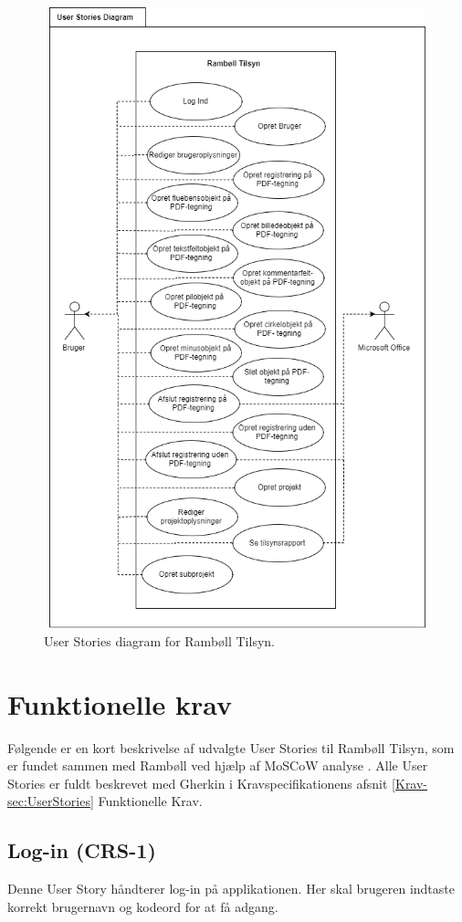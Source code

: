 	\begin{figure}[H]
		\centering
		\includegraphics[height=18cm, width=12cm]{Kravspecifikation/UserStorieDiagram}
		\caption{User Stories diagram for Rambøll Tilsyn.}
		\label{fig:Userstoriediagram}
	\end{figure}
	
	\clearpage
	
\section{Funktionelle krav} \label{sec:UserS}
	Følgende er en kort beskrivelse af udvalgte User Stories til Rambøll Tilsyn, som er fundet sammen med Rambøll ved hjælp af MoSCoW analyse \cite{MoSCoW}. Alle User Stories er fuldt beskrevet med Gherkin i Kravspecifikationens afsnit \ref{Krav-sec:UserStories} Funktionelle Krav.

	\subsection*{Log-in (CRS-1)}
	Denne User Story håndterer log-in på applikationen. Her skal brugeren indtaste korrekt brugernavn og kodeord for at få adgang.
	
